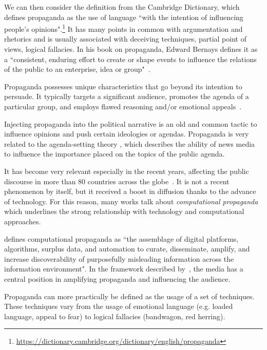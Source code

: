 
We can then consider the definition from the Cambridge Dictionary, which defines propaganda as the use of language ``with the intention of influencing people's opinions".\footnote{\url{https://dictionary.cambridge.org/dictionary/english/propaganda}}
It has many points in common with argumentation and rhetorics and is usually associated with deceiving techniques, partial point of views, logical fallacies.
In his book on propaganda, Edward Bernays defines it as a ``consistent, enduring effort to create or shape events to influence the relations of the public to an enterprise, idea or group"~\cite{bernays}.

Propaganda possesses unique characteristics that go beyond its intention to persuade. It typically targets a significant audience, promotes the agenda of a particular group, and employs flawed reasoning and/or emotional appeals~\cite{miller1939techniques}.

Injecting propaganda into the political narrative is an old and common tactic to influence opinions and push certain ideologies or agendas.
Propaganda is very related to the agenda-setting theory \citep{Cohen_1964,mccombs1972agenda}, which describes the ability of news media to influence the importance placed on the topics of the public agenda.

It has become very relevant especially in the recent years, affecting the public discourse in more than 80 countries across the globe~\citep{bradshaw2021industrialized}.
It is not a recent phenomenon by itself, but it received a boost in diffusion thanks to the advance of technology.
For this reason, many works talk about \emph{computational propaganda} which underlines the strong relationship with technology and computational approaches.

\citep{hassan2023} defines computational propaganda as ``the assemblage of digital platforms, algorithms, surplus data, and automation to curate, disseminate, amplify,
and increase discoverability of purposefully misleading information across the information
environment".
In the framework described by~\citet{hassan2023}, the media has a central position in amplifying propaganda and influencing the audience.

Propaganda can more practically be defined as the usage of a set of techniques. These techniques vary from the usage of emotional language (e.g. loaded language, appeal to fear) to logical fallacies (bandwagon, red herring).

